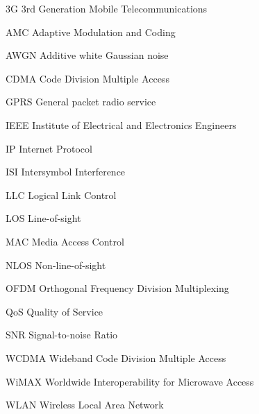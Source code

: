 \begin{denotation}
\item[3G] 3rd Generation Mobile Telecommunications
\item[AMC] Adaptive Modulation and Coding
\item[AWGN]  Additive white Gaussian noise
\item[CDMA] Code Division Multiple Access 
  \item[GPRS] General packet radio service
  \item[IEEE] Institute of Electrical and Electronics Engineers
  \item[IP] Internet Protocol
  \item[ISI] Intersymbol Interference
  \item[LLC] Logical Link Control
  \item[LOS] Line-of-sight
  \item[MAC] Media Access Control
  \item[NLOS] Non-line-of-sight
  \item[OFDM] Orthogonal Frequency Division Multiplexing 
  \item[QoS] Quality of Service
  \item[SNR] Signal-to-noise Ratio
  \item[WCDMA] Wideband Code Division Multiple Access
  \item[WiMAX] Worldwide Interoperability for Microwave Access
  \item[WLAN] Wireless Local Area Network

\end{denotation}
